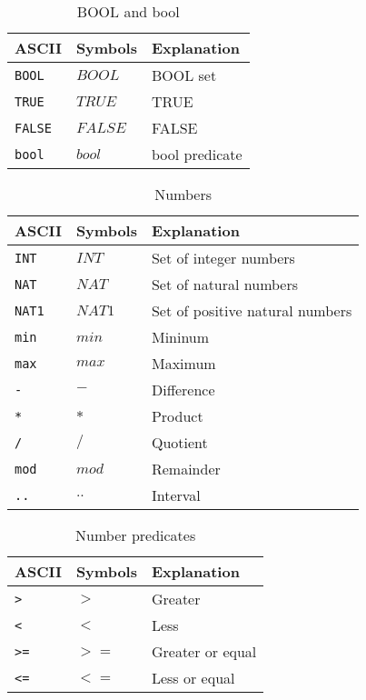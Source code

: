 \begin{table}[!htbp]
  \centering
  \begin{tabular}{|l|l|l|}
    \hline
    ASCII & Symbols & Explanation \\
    \hline
    \verb|BOOL| & $BOOL$ & BOOL set \\
    \verb$TRUE$ & $TRUE$ & TRUE \\
    \verb|FALSE| & $FALSE$ & FALSE \\
    \verb|bool| & $bool$ & bool predicate \\
    \hline
  \end{tabular}
  \caption{BOOL and bool}
\end{table}
 
\begin{table}[!htbp]
  \centering
  \begin{tabular}{|l|l|l|}
    \hline
    ASCII & Symbols & Explanation \\
    \hline
    \verb|INT| & $INT$ & Set of integer numbers \\
    \verb|NAT| & $NAT$ & Set of natural numbers \\
    \verb|NAT1| & $NAT1$ & Set of positive natural numbers \\
    \verb|min| & $min$ & Mininum \\
    \verb|max| & $max$ & Maximum \\
    \verb|-| & $-$ & Difference \\
    \verb|*| & $*$ & Product \\
    \verb|/| & $/$ & Quotient \\
    \verb|mod| & $mod$ & Remainder \\
    \verb|..| & $..$ & Interval  \\
    \hline
  \end{tabular}
  \caption{Numbers}
\end{table}

\begin{table}[!htbp]
  \centering
  \begin{tabular}{|l|l|l|}
    \hline
    ASCII & Symbols & Explanation \\
    \hline
    \verb|>| & $>$ & Greater \\
    \verb|<| & $<$ & Less \\
    \verb|>=| & $>=$ & Greater or equal \\
    \verb|<=| & $<=$ & Less or equal \\
    \hline
  \end{tabular}
  \caption{Number predicates}
\end{table}

